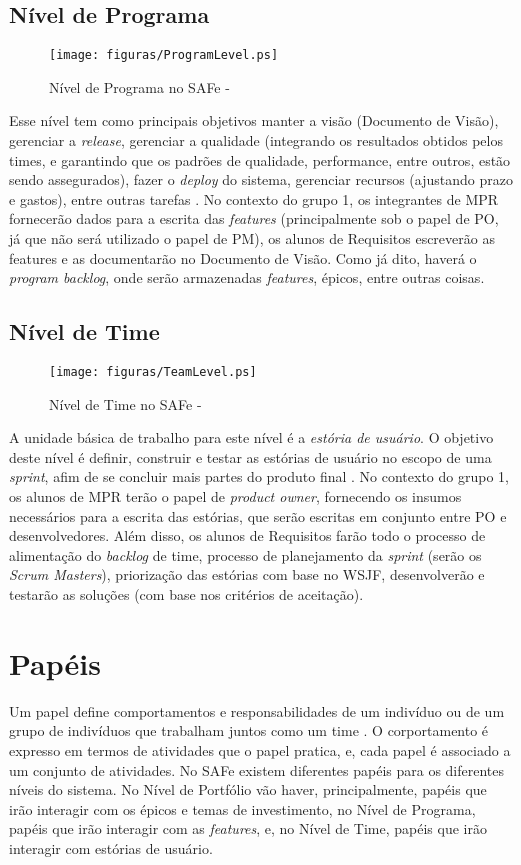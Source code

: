 \subsection{Nível de Programa}
\begin{figure}[h]
  \centering
  \caption{Nível de Programa no SAFe - \cite[p. 39]{safe001}}
  \texttt{[image: figuras/ProgramLevel.ps]}
\end{figure}
Esse nível tem como principais objetivos manter a visão (Documento de Visão), gerenciar a \emph{release}, gerenciar a qualidade (integrando os resultados obtidos pelos times, e garantindo que os padrões de qualidade, performance, entre outros, estão sendo assegurados), fazer o \emph{deploy} do sistema, gerenciar recursos (ajustando prazo e gastos), entre outras tarefas \cite[p. 63-64]{safe001}. No contexto do grupo 1, os integrantes de MPR fornecerão dados para a escrita das \emph{features} (principalmente sob o papel de PO, já que não será utilizado o papel de PM), os alunos de Requisitos escreverão as features e as documentarão no Documento de Visão. Como já dito, haverá o \emph{program backlog}, onde serão armazenadas \emph{features}, épicos, entre outras coisas.

\subsection{Nível de Time}
\begin{figure}[h]
  \centering
  \caption{Nível de Time no SAFe - \cite[p. 34]{safe001}}
  \texttt{[image: figuras/TeamLevel.ps]}
\end{figure}
A unidade básica de trabalho para este nível é a \emph{estória de usuário}. O objetivo deste nível é definir, construir e testar as estórias de usuário no escopo de uma \emph{sprint}, afim de se concluir mais partes do produto final \cite[p. 47-48]{safe001}. No contexto do grupo 1, os alunos de MPR terão o papel de \emph{product owner}, fornecendo os insumos necessários para a escrita das estórias, que serão escritas em conjunto entre PO e desenvolvedores. Além disso, os alunos de Requisitos farão todo o processo de alimentação do \emph{backlog} de time, processo de planejamento da \emph{sprint} (serão os \emph{Scrum Masters}), priorização das estórias com base no WSJF, desenvolverão e testarão as soluções (com base nos critérios de aceitação).

\section{Papéis}
Um papel define comportamentos e responsabilidades de um indivíduo ou de um grupo de indivíduos que trabalham juntos como um time \cite[p. 61-65]{kruchten001}. O corportamento é expresso em termos de atividades que o papel pratica, e, cada papel é associado a um conjunto de atividades. No SAFe existem diferentes papéis para os diferentes níveis do sistema. No Nível de Portfólio vão haver, principalmente, papéis que irão interagir com os épicos e temas de investimento, no Nível de Programa, papéis que irão interagir com as \emph{features}, e, no Nível de Time, papéis que irão interagir com estórias de usuário.

